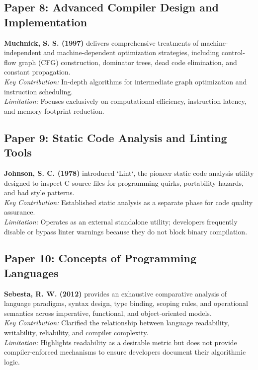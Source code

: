 \subsection{Paper 8: Advanced Compiler Design and Implementation}
\textbf{Muchnick, S. S. (1997)} \cite{muchnick1997advanced} delivers comprehensive treatments of machine-independent and machine-dependent optimization strategies, including control-flow graph (CFG) construction, dominator trees, dead code elimination, and constant propagation. \\
\textit{Key Contribution:} In-depth algorithms for intermediate graph optimization and instruction scheduling. \\
\textit{Limitation:} Focuses exclusively on computational efficiency, instruction latency, and memory footprint reduction.

\subsection{Paper 9: Static Code Analysis and Linting Tools}
\textbf{Johnson, S. C. (1978)} \cite{johnson1978lint} introduced `Lint`, the pioneer static code analysis utility designed to inspect C source files for programming quirks, portability hazards, and bad style patterns. \\
\textit{Key Contribution:} Established static analysis as a separate phase for code quality assurance. \\
\textit{Limitation:} Operates as an external standalone utility; developers frequently disable or bypass linter warnings because they do not block binary compilation.

\subsection{Paper 10: Concepts of Programming Languages}
\textbf{Sebesta, R. W. (2012)} \cite{sebesta2012concepts} provides an exhaustive comparative analysis of language paradigms, syntax design, type binding, scoping rules, and operational semantics across imperative, functional, and object-oriented models. \\
\textit{Key Contribution:} Clarified the relationship between language readability, writability, reliability, and compiler complexity. \\
\textit{Limitation:} Highlights readability as a desirable metric but does not provide compiler-enforced mechanisms to ensure developers document their algorithmic logic.

